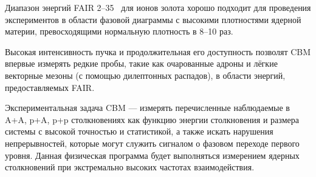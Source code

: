 Диапазон энергий FAIR 2--35~\GeVperNucl{} для ионов золота хорошо подходит для проведения экспериментов в области фазовой диаграммы с высокими плотностями ядерной материи, превосходящими нормальную плотность в 8--10 раз.

Высокая интенсивность пучка и продолжительная его доступность позволят CBM впервые измерять редкие пробы, такие как очарованные адроны и лёгкие векторные мезоны (с помощью дилептонных распадов), в области энергий, предоставляемых FAIR.

Экспериментальная задача CBM --- измерять перечисленные наблюдаемые в A+A, p+A, p+p столкновениях как функцию энергии столкновения и размера системы с высокой точностью и статистикой, а также искать нарушения непрерывностей, которые могут служить сигналом о фазовом переходе первого уровня. Данная физическая программа будет выполняться измерением ядерных столкновений при экстремально высоких частотах взаимодействия.
